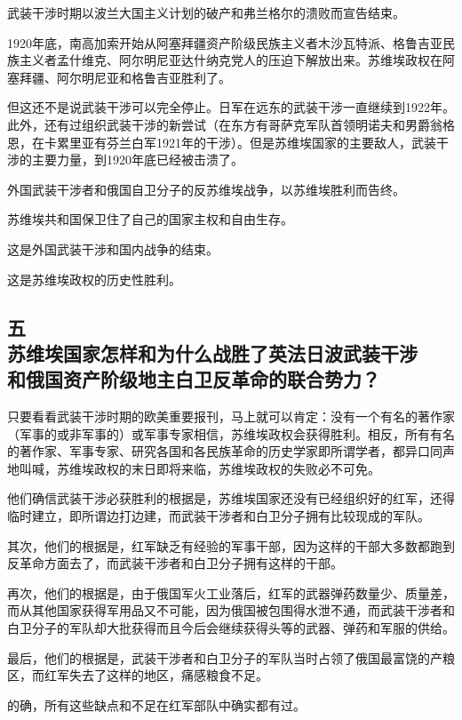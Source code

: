 武装干涉时期以波兰大国主义计划的破产和弗兰格尔的溃败而宣告结束。

1920年底，南高加索开始从阿塞拜疆资产阶级民族主义者木沙瓦特派、格鲁吉亚民族主义者孟什维克、阿尔明尼亚达什纳克党人的压迫下解放出来。苏维埃政权在阿塞拜疆、阿尔明尼亚和格鲁吉亚胜利了。

但这还不是说武装干涉可以完全停止。日军在远东的武装干涉一直继续到1922年。此外，还有过组织武装干涉的新尝试（在东方有哥萨克军队首领明诺夫和男爵翁格恩，在卡累里亚有芬兰白军1921年的干涉）。但是苏维埃国家的主要敌人，武装干涉的主要力量，到1920年底已经被击溃了。

外国武装干涉者和俄国自卫分子的反苏维埃战争，以苏维埃胜利而告终。

苏维埃共和国保卫住了自己的国家主权和自由生存。

这是外国武装干涉和国内战争的结束。

这是苏维埃政权的历史性胜利。


\subsection[五\q 苏维埃国家怎样和为什么战胜了英法日波武装干涉和俄国资产阶级地主白卫反革命的联合势力？]{五\\苏维埃国家怎样和为什么战胜了英法日波武装干涉\\和俄国资产阶级地主白卫反革命的联合势力？}

只要看看武装干涉时期的欧美重要报刊，马上就可以肯定：没有一个有名的著作家（军事的或非军事的）或军事专家相信，苏维埃政权会获得胜利。相反，所有有名的著作家、军事专家、研究各国和各民族革命的历史学家即所谓学者，都异口同声地叫喊，苏维埃政权的末日即将来临，苏维埃政权的失败必不可免。

他们确信武装干涉必获胜利的根据是，苏维埃国家还没有已经组织好的红军，还得临时建立，即所谓边打边建，而武装干涉者和白卫分子拥有比较现成的军队。

其次，他们的根据是，红军缺乏有经验的军事干部，因为这样的干部大多数都跑到反革命方面去了，而武装干涉者和白卫分子拥有这样的干部。

再次，他们的根据是，由于俄国军火工业落后，红军的武器弹药数量少、质量差，而从其他国家获得军用品又不可能，因为俄国被包围得水泄不通，而武装干涉者和白卫分子的军队却大批获得而且今后会继续获得头等的武器、弹药和军服的供给。

最后，他们的根据是，武装干涉者和白卫分子的军队当时占领了俄国最富饶的产粮区，而红军失去了这样的地区，痛感粮食不足。

的确，所有这些缺点和不足在红军部队中确实都有过。

